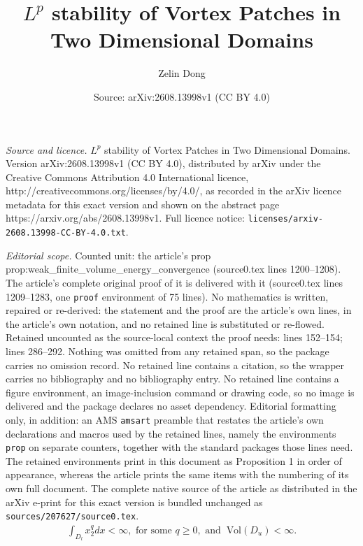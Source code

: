 \documentclass[10pt,a4paper]{amsart}
\title{$L^p$ stability of Vortex Patches in Two Dimensional Domains}
\author{Zelin Dong}
\date{Source: arXiv:2608.13998v1 (CC BY 4.0)}
\renewcommand{\tt}[1]{\text{#1}}
\begin{document}
\maketitle

\noindent\emph{Source and licence.} $L^p$ stability of Vortex Patches in Two Dimensional Domains. Version arXiv:2608.13998v1 (CC BY 4.0), distributed by arXiv under the Creative Commons Attribution 4.0 International licence, http://creativecommons.org/licenses/by/4.0/, as recorded in the arXiv licence metadata for this exact version and shown on the abstract page https://arxiv.org/abs/2608.13998v1. Full licence notice: \texttt{licenses/arxiv-2608.13998-CC-BY-4.0.txt}.\par\smallskip

\noindent\textit{Editorial scope.} Counted unit: the article's prop prop:weak\_finite\_volume\_energy\_convergence (source0.tex lines 1200--1208). The article's complete original proof of it is delivered with it (source0.tex lines 1209--1283, one \texttt{proof} environment of 75 lines). No mathematics is written, repaired or re-derived: the statement and the proof are the article's own lines, in the article's own notation, and no retained line is substituted or re-flowed.  Retained uncounted as the source-local context the proof needs: lines 152--154; lines 286--292.  Nothing was omitted from any retained span, so the package carries no omission record.  No retained line contains a citation, so the wrapper carries no bibliography and no bibliography entry.  No retained line contains a figure environment, an image-inclusion command or drawing code, so no image is delivered and the package declares no asset dependency.  Editorial formatting only, in addition: an AMS \texttt{amsart} preamble that restates the article's own declarations and macros used by the retained lines, namely the environments \texttt{prop} on separate counters, together with the standard packages those lines need.  The retained environments print in this document as Proposition 1 in order of appearance, whereas the article prints the same items with the numbering of its own full document.  The complete native source of the article as distributed in the arXiv e-print for this exact version is bundled unchanged as \texttt{sources/207627/source0.tex}.
                \begin{align}
                    \int_{D_l} x_2^q dx<\infty, \tt{ for some } q\geq 0,\tt{ and } ~ \tt{Vol}(D_u)<\infty. \label{def:weak_finite_volume_domain_assumption}
                \end{align}
\end{document}
